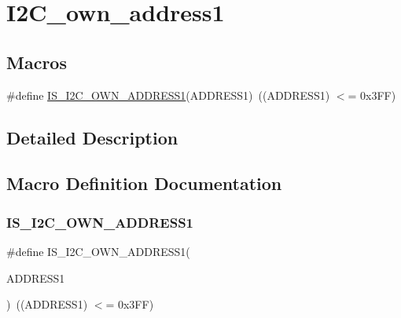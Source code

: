 \hypertarget{group___i2_c__own__address1}{}\section{I2\+C\+\_\+own\+\_\+address1}
\label{group___i2_c__own__address1}
\subsection*{Macros}
\begin{DoxyCompactItemize}
\item 
\#define \mbox{\hyperlink{group___i2_c__own__address1_gad84e8b9523d45b6105b4d5cb68994a79}{I\+S\+\_\+\+I2\+C\+\_\+\+O\+W\+N\+\_\+\+A\+D\+D\+R\+E\+S\+S1}}(A\+D\+D\+R\+E\+S\+S1)~((A\+D\+D\+R\+E\+S\+S1) $<$= 0x3\+F\+F)
\end{DoxyCompactItemize}


\subsection{Detailed Description}


\subsection{Macro Definition Documentation}
\mbox{\label{group___i2_c__own__address1_gad84e8b9523d45b6105b4d5cb68994a79}} 
\subsubsection{\texorpdfstring{IS\_I2C\_OWN\_ADDRESS1}{IS\_I2C\_OWN\_ADDRESS1}}
{\footnotesize\ttfamily \#define I\+S\+\_\+\+I2\+C\+\_\+\+O\+W\+N\+\_\+\+A\+D\+D\+R\+E\+S\+S1(\begin{DoxyParamCaption}\item[{}]{A\+D\+D\+R\+E\+S\+S1 }\end{DoxyParamCaption})~((A\+D\+D\+R\+E\+S\+S1) $<$= 0x3\+F\+F)}

